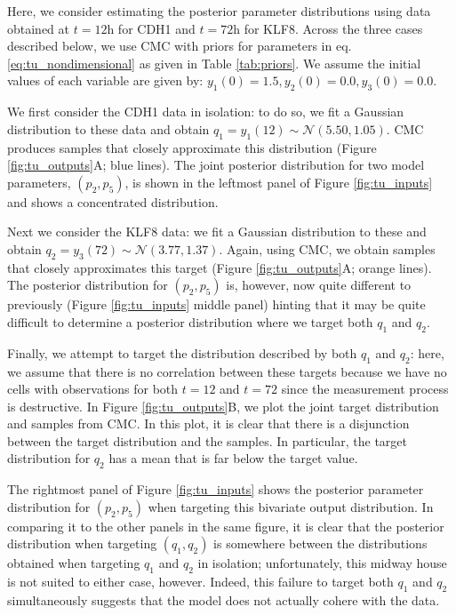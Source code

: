 Here, we consider estimating the posterior parameter distributions using data obtained at $t=12 \text{h}$ for CDH1 and $t=72 \text{h}$ for KLF8. Across the three cases described below, we use CMC with priors for parameters in eq. \eqref{eq:tu_nondimensional} as given in Table \ref{tab:priors}. We assume the initial values of each variable are given by: $y_1(0) = 1.5, y_2(0) = 0.0, y_3(0) = 0.0$.

We first consider the CDH1 data in isolation: to do so, we fit a Gaussian distribution to these data and obtain $q_1=y_1(12)  \sim \mathcal{N}(5.50, 1.05)$. CMC produces samples that closely approximate this distribution (Figure \ref{fig:tu_outputs}A; blue lines). The joint posterior distribution for two model parameters, $(p_2, p_5)$, is shown in the leftmost panel of Figure \ref{fig:tu_inputs} and shows a concentrated distribution.

Next we consider the KLF8 data: we fit a Gaussian distribution to these and obtain $q_2=y_3(72)  \sim \mathcal{N}(3.77, 1.37)$.  Again, using CMC, we obtain samples that closely approximates this target (Figure \ref{fig:tu_outputs}A; orange lines). The posterior distribution for $(p_2, p_5)$ is, however, now quite different to previously (Figure \ref{fig:tu_inputs} middle panel) hinting that it may be quite difficult to determine a posterior distribution where we target both $q_1$ and $q_2$.

Finally, we attempt to target the distribution described by both $q_1$ and $q_2$: here, we assume that there is no correlation between these targets because we have no cells with observations for both $t=12$ and $t=72$ since the measurement process is destructive. In Figure \ref{fig:tu_outputs}B, we plot the joint target distribution and samples from CMC. In this plot, it is clear that there is a disjunction between the target distribution and the samples. In particular, the target distribution for $q_2$ has a mean that is far below the target value.

The rightmost panel of Figure \ref{fig:tu_inputs} shows the posterior parameter distribution for $(p_2, p_5)$ when targeting this bivariate output distribution. In comparing it to the other panels in the same figure, it is clear that the posterior distribution when targeting $(q_1,q_2)$ is somewhere between the distributions obtained when targeting $q_1$ and $q_2$ in isolation; unfortunately, this midway house is not suited to either case, however. Indeed, this failure to target both $q_1$ and $q_2$ simultaneously suggests that the model does not actually cohere with the data.

